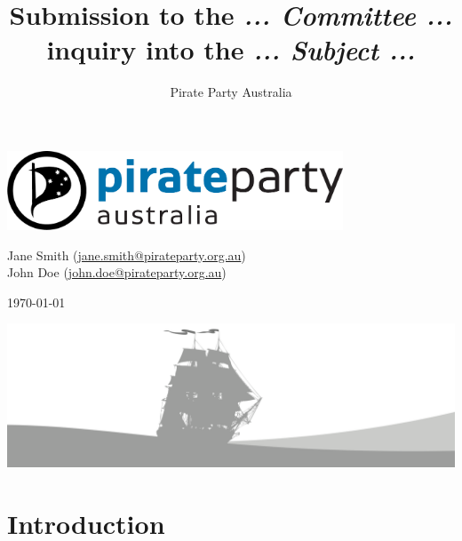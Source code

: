 \documentclass[a4paper,11pt]{article}
\title{Submission to the \textit{... Committee ...} inquiry into the \textit{... Subject ...}}
\author{Pirate Party Australia}
\makeatletter
\let\Title\@title
\makeatother
\begin{document}

\begin{center}

\vspace*{0.5in} 

\includegraphics[width=0.75\textwidth]{logo}

\vspace{1in}

\huge{%
  \Title
}

\vfill

\onehalfspacing

\large{%
  Jane Smith
  (\href{mailto:jane.smith@pirateparty.org.au}
  {jane.smith@pirateparty.org.au})\\

  John Doe
  (\href{mailto:john.doe@pirateparty.org.au}
  {john.doe@pirateparty.org.au})\\

  \vspace{0.5in}

  \today
}

\vfill

\hspace*{-1.25in}\includegraphics[width=1.1\paperwidth]{boat-branding}

\end{center}

\restoregeometry

\newpage
\onehalfspacing
\tableofcontents

\newpage

\section{Introduction}
\end{document}
